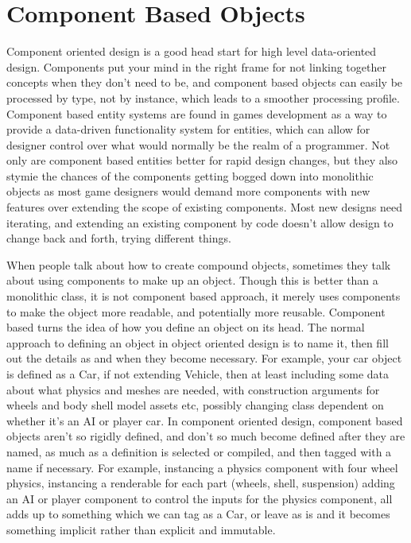 \chapter{Component Based Objects}

Component oriented design is a good head start for high level data-oriented
design. Components put your mind in the right frame for not linking together
concepts when they don't need to be, and component based objects can easily be
processed by type, not by instance, which leads to a smoother processing
profile. Component based entity systems are found in games development as a
way to provide a data-driven functionality system for entities, which can allow
for designer control over what would normally be the realm of a programmer. Not
only are component based entities better for rapid design changes, but they
also stymie the chances of the components getting bogged down into monolithic
objects as most game designers would demand more components with new features
over extending the scope of existing components.  Most new designs need
iterating, and extending an existing component by code doesn't allow design to
change back and forth, trying different things.

When people talk about how to create compound objects, sometimes they talk
about using components to make up an object. Though this is better than a
monolithic class, it is not component based approach, it merely uses components
to make the object more readable, and potentially more reusable. Component
based turns the idea of how you define an object on its head. The normal
approach to defining an object in object oriented design is to name it, then
fill out the details as and when they become necessary. For example, your car
object is defined as a Car, if not extending Vehicle, then at least including
some data about what physics and meshes are needed, with construction arguments
for wheels and body shell model assets etc, possibly changing class dependent
on whether it's an AI or player car. In component oriented design, component
based objects aren't so rigidly defined, and don't so much become defined after
they are named, as much as a definition is selected or compiled, and then
tagged with a name if necessary. For example, instancing a physics component
with four wheel physics, instancing a renderable for each part (wheels, shell,
suspension) adding an AI or player component to control the inputs for the
physics component, all adds up to something which we can tag as a Car, or leave
as is and it becomes something implicit rather than explicit and immutable.

